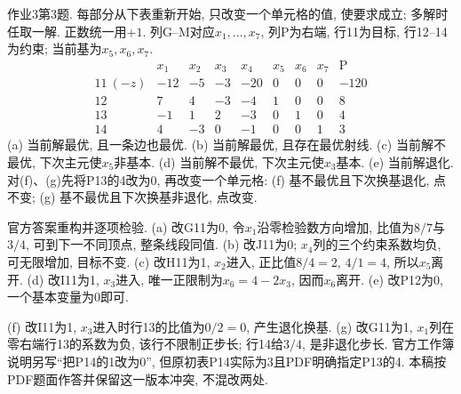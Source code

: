 \begin{exercise}\label{ass:15053-ps3-q3}
作业3第3题. 每部分从下表重新开始, 只改变一个单元格的值, 使要求成立; 多解时任取一解. 正数统一用$+1$. 列G--M对应$x_1,\ldots,x_7$, 列P为右端, 行11为目标, 行12--14为约束; 当前基为$x_5,x_6,x_7$.
\[
\begin{array}{c|rrrrrrr|r}
 &x_1&x_2&x_3&x_4&x_5&x_6&x_7&\text{P}\\\hline
11\ (-z)&-12&-5&-3&-20&0&0&0&-120\\
12&7&4&-3&-4&1&0&0&8\\
13&-1&1&2&-3&0&1&0&4\\
14&4&-3&0&-1&0&0&1&3
\end{array}
\]
(a) 当前解最优, 且一条边也最优. (b) 当前解最优, 且存在最优射线. (c) 当前解不最优, 下次主元使$x_5$非基本. (d) 当前解不最优, 下次主元使$x_3$基本. (e) 当前解退化. 对(f)、(g)先将P13的4改为0, 再改变一个单元格: (f) 基不最优且下次换基退化, 点不变; (g) 基不最优且下次换基非退化, 点改变.
\end{exercise}
\begin{solution}
官方答案重构并逐项检验. (a) 改G11为0, 令$x_1$沿零检验数方向增加, 比值为$8/7$与$3/4$, 可到下一不同顶点, 整条线段同值. (b) 改J11为0; $x_4$列的三个约束系数均负, 可无限增加, 目标不变. (c) 改H11为1, $x_2$进入, 正比值$8/4=2$, $4/1=4$, 所以$x_5$离开. (d) 改I11为1, $x_3$进入, 唯一正限制为$x_6=4-2x_3$, 因而$x_6$离开. (e) 改P12为0, 一个基本变量为0即可.

(f) 改I11为1, $x_3$进入时行13的比值为$0/2=0$, 产生退化换基. (g) 改G11为1, $x_1$列在零右端行13的系数为负, 该行不限制正步长; 行14给$3/4$, 是非退化步长. 官方工作簿说明另写“把P14的1改为0”, 但原初表P14实际为3且PDF明确指定P13的4. 本稿按PDF题面作答并保留这一版本冲突, 不混改两处.
\end{solution}

